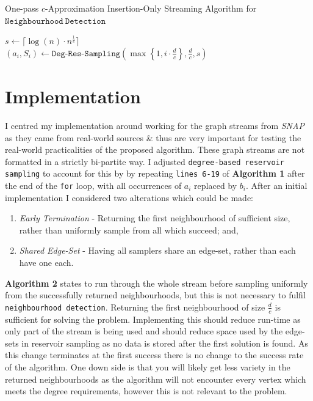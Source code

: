 \documentclass[11pt,twoside,a4paper]{report}
\begin{document}
\begin{algorithm}
	\caption{One-pass $c$-Approximation Insertion-Only Streaming Algorithm for $\mathtt{Neighbourhood\ Detection}$}
	$s\leftarrow\lceil\log(n)\cdot n^{\frac1c}\rceil$\\
	 {
		$(a_i,S_i)\leftarrow\mathtt{Deg}\mbox{-}\mathtt{Res}\mbox{-}\mathtt{Sampling}\left(\max\left\{1,i\cdot\frac{d}{c}\right\},\frac{d}c,s\right)$
	}
\end{algorithm}

\section{Implementation}

I centred my implementation around working for the graph streams from \textit{SNAP} \cite{SNAP} as they came from real-world sources \& thus are very important for testing the real-world practicalities of the proposed algorithm. These graph streams are not formatted in a strictly bi-partite way. I adjusted \texttt{degree-based reservoir sampling} to account for this by by repeating \texttt{lines 6-19} of \textbf{Algorithm 1} after the end of the \texttt{for} loop, with all occurrences of $a_i$ replaced by $b_i$.
\vspace{.3cm}\newline
After an initial implementation I considered two alterations which could be made:
\begin{enumerate}
	\item \textit{Early Termination} - Returning the first neighbourhood of sufficient size, rather than uniformly sample from all which succeed; and,
	\item \textit{Shared Edge-Set} - Having all samplers share an edge-set, rather than each have one each.
\end{enumerate}

\noindent\textbf{Algorithm 2} states to run through the whole stream before sampling uniformly from the successfully returned neighbourhoods, but this is not necessary to fulfil \texttt{neighbourhood detection}. Returning the first neighbourhood of size $\frac{d}c$ is sufficient for solving the problem. Implementing this should reduce run-time as only part of the stream is being used and should reduce space used by the edge-sets in reservoir sampling as no data is stored after the first solution is found. As this change terminates at the first success there is no change to the success rate of the algorithm. One down side is that you will likely get less variety in the returned neighbourhoods as the algorithm will not encounter every vertex which meets the degree requirements, however this is not relevant to the problem.
\end{document}
